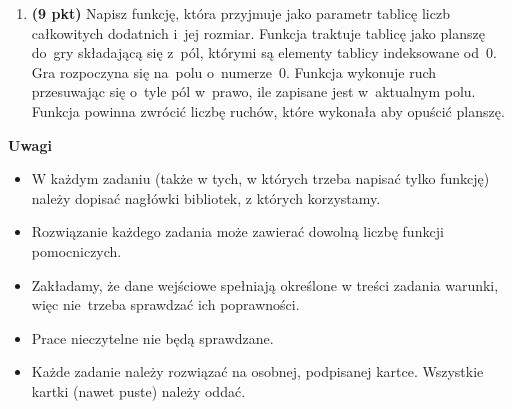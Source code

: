 \documentclass[11pt]{article}
\begin{document}
\begin{enumerate}
 \item \textbf{(9 pkt)}
Napisz funkcję, która przyjmuje jako parametr tablicę liczb całkowitych dodatnich i~jej rozmiar.
Funkcja traktuje tablicę jako planszę do~gry składającą się z~pól, którymi są elementy tablicy indeksowane od~0.
Gra rozpoczyna się na~polu o~numerze~0.
Funkcja wykonuje ruch przesuwając się o~tyle pól w~prawo, ile zapisane jest w~aktualnym polu.
Funkcja powinna zwrócić liczbę ruchów, które wykonała aby opuścić planszę.

\end{enumerate}

\textbf{Uwagi}

\begin{itemize}
 \item W każdym zadaniu (także w tych, w których trzeba napisać tylko funkcję) należy dopisać nagłówki bibliotek, z których korzystamy.
 \item Rozwiązanie każdego zadania może zawierać dowolną liczbę funkcji pomocniczych.
 \item Zakładamy, że dane wejściowe spełniają określone w treści zadania warunki, więc nie~trzeba sprawdzać ich poprawności.
 \item Prace nieczytelne nie będą sprawdzane.
 \item Każde zadanie należy rozwiązać na osobnej, podpisanej kartce. Wszystkie kartki (nawet puste) należy oddać.
\end{itemize}
\end{document}
